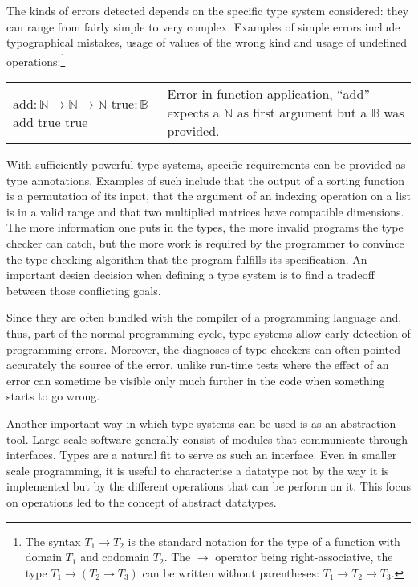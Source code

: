 The kinds of errors detected depends on the specific type system considered: they can range from
fairly simple to very complex. Examples of simple errors include typographical mistakes, usage of
values of the wrong kind and usage of undefined operations:\footnote{The syntax $T_1 \to T_2$ is the
standard notation for the type of a function with domain $T_1$ and codomain $T_2$. The $\to$
operator being right-associative, the type $T_1 \to (T_2 \to T_3)$ can be written without
parentheses: $T_1 \to T_2 \to T_3$.}

\begin{center}
  \begin{tabular}{m{3.5cm} | m{5.5cm}}
    $\text{add} : \mathbb{N} \to \mathbb{N} \to \mathbb{N}$ \newline
    $\text{true} : \mathbb{B}$ \newline
    add true true
    & Error in function application, ``add'' expects a $\mathbb{N}$ as first argument but a
    $\mathbb{B}$ was provided.
  \end{tabular}
\end{center}

With sufficiently powerful type systems, specific requirements can be provided as type annotations.
Examples of such include that the output of a sorting function is a permutation of its input, that
the argument of an indexing operation on a list is in a valid range and that two multiplied matrices
have compatible dimensions. The more information one puts in the types, the more invalid programs
the type checker can catch, but the more work is required by the programmer to convince the
type checking algorithm that the program fulfills its specification. An important design decision
when defining a type system is to find a tradeoff between those conflicting goals.

Since they are often bundled with the compiler of a programming language and, thus, part of the
normal programming cycle, type systems allow early detection of programming errors. Moreover, the
diagnoses of type checkers can often pointed accurately the source of the error, unlike run-time
tests where the effect of an error can sometime be visible only much further in the code when
something starts to go wrong.

Another important way in which type systems can be used is as an abstraction tool. Large scale
software generally consist of modules that communicate through interfaces. Types are a natural fit
to serve as such an interface. Even in smaller scale programming, it is useful to characterise a
datatype not by the way it is implemented but by the different operations that can be perform on it.
This focus on operations led to the concept of abstract datatypes.

